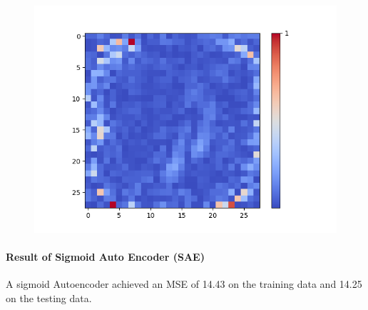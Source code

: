 \begin{figure}[H]
\begin{minipage}[b]{0.19\textwidth}
		\includegraphics[width=\textwidth]{Linear-AE/Feature-18.png}
		\label{}
	\end{minipage}
	
	\hfill
\end{figure}

\paragraph{Result of Sigmoid Auto Encoder (SAE)}
A sigmoid Autoencoder achieved an MSE of 14.43 on the training data and 14.25 on the testing data.

